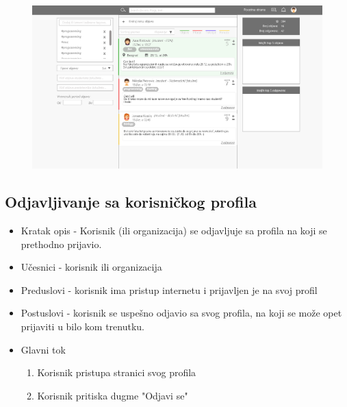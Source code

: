 \begin{figure}[h!]
		\centerline{\includegraphics[scale=0.3]{slike/pocetna_strana.png}}
\end{figure}

\clearpage

\subsection{Odjavljivanje sa korisničkog profila}
\begin{itemize}
	\item Kratak opis - Korisnik (ili organizacija) se odjavljuje sa profila na koji se prethodno prijavio.
	\item Učesnici - korisnik ili organizacija
	\item Preduslovi - korisnik ima pristup internetu i prijavljen je na svoj profil
	\item Postuslovi - korisnik se uspešno odjavio sa svog profila, na koji se može opet prijaviti u bilo kom trenutku.
	\item Glavni tok
		\begin{enumerate}
			\item Korisnik pristupa stranici svog profila
			\item Korisnik pritiska dugme "Odjavi se"
		\end{enumerate}
\end{itemize}
